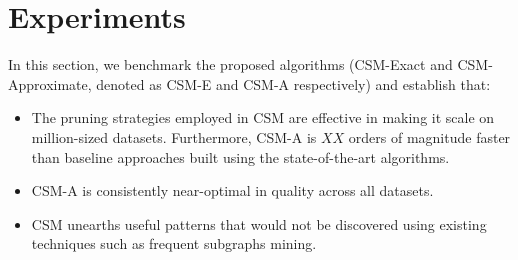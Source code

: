 \section{Experiments}
\label{sec:experiments}

In this section, we benchmark the proposed algorithms (CSM-Exact and CSM-Approximate, denoted as CSM-E and CSM-A respectively) and establish that:
\begin{itemize}
\item The pruning strategies employed in CSM are effective in making it scale on million-sized datasets. Furthermore, CSM-A is $XX$ orders of magnitude faster than baseline approaches built using the state-of-the-art algorithms.
\item CSM-A is consistently near-optimal in quality across all datasets.
\item CSM unearths useful patterns that would not be discovered using existing techniques such as frequent subgraphs mining.
\end{itemize}




